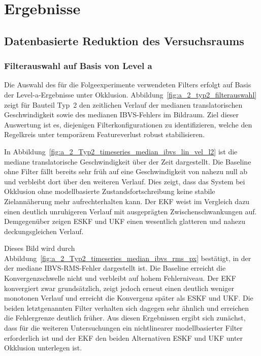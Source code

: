 \chapter{Ergebnisse}
\label{ch:ergebnisse}

\section{Datenbasierte Reduktion des Versuchsraums}

\subsection{Filterauswahl auf Basis von Level a}

Die Auswahl des für die Folgeexperimente verwendeten Filters erfolgt auf Basis der Level-a-Ergebnisse unter Okklusion. Abbildung~\ref{fig:a_2_typ2_filterauswahl} zeigt für Bauteil Typ~2 den zeitlichen Verlauf der medianen translatorischen Geschwindigkeit sowie des medianen \ac{IBVS}-Fehlers im Bildraum. Ziel dieser Auswertung ist es, diejenigen Filterkonfigurationen zu identifizieren, welche den Regelkreis unter temporärem Featureverlust robust stabilisieren.

In Abbildung~\ref{fig:a_2_Typ2_timeseries_median_ibvs_lin_vel_l2} ist die mediane translatorische Geschwindigkeit über der Zeit dargestellt. Die Baseline ohne Filter fällt bereits sehr früh auf eine Geschwindigkeit von nahezu null ab und verbleibt dort über den weiteren Verlauf. Dies zeigt, dass das System bei Okklusion ohne modellbasierte Zustandsfortschreibung keine stabile Zielannäherung mehr aufrechterhalten kann. Der \ac{EKF} weist im Vergleich dazu einen deutlich unruhigeren Verlauf mit ausgeprägten Zwischenschwankungen auf. Demgegenüber zeigen \ac{ESKF} und \ac{UKF} einen wesentlich glatteren und nahezu deckungsgleichen Verlauf.

Dieses Bild wird durch Abbildung~\ref{fig:a_2_Typ2_timeseries_median_ibvs_rms_px} bestätigt, in der der mediane \ac{IBVS}-RMS-Fehler dargestellt ist. Die Baseline erreicht die Konvergenzschwelle nicht und verbleibt auf hohem Fehlerniveau. Der \ac{EKF} konvergiert zwar grundsätzlich, zeigt jedoch erneut einen deutlich weniger monotonen Verlauf und erreicht die Konvergenz später als \ac{ESKF} und \ac{UKF}. Die beiden letztgenannten Filter verhalten sich dagegen sehr ähnlich und erreichen die Fehlergrenze deutlich früher. Aus diesen Ergebnissen ergibt sich zunächst, dass für die weiteren Untersuchungen ein nichtlinearer modellbasierter Filter erforderlich ist und der \ac{EKF} den beiden Alternativen \ac{ESKF} und \ac{UKF} unter Okklusion unterlegen ist.


